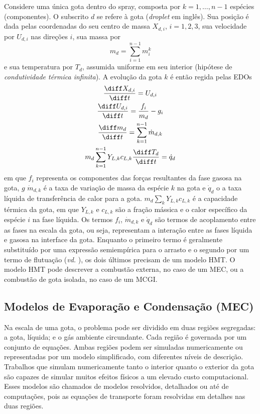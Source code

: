 Considere uma única gota dentro do spray, composta por $k=1,\ldots,n-1$ espécies (componentes).
O subscrito $d$ se refere à gota (\emph{droplet} em inglês).
Sua posição é dada pelas coordenadas do seu centro de massa $X_{d,i}$, $i=1,2,3$, sua velocidade por $U_{d,i}$ nas direções $i$, sua massa por 
\begin{equation}    
    m_d = \sum_{i=1}^{n-1} m_{i}^k
\end{equation}
e sua temperatura por $T_d$, assumida uniforme em seu interior (hipótese de \emph{condutividade térmica infinita}).
A evolução da gota $k$ é então regida pelas EDOs \cite{JennyB2012}
\begin{gather}
    \frac{\diff X_{d,i}}{\diff t} = U_{d,i}
    \label{eq:Ud}\\
    \frac{\diff U_{d,i}}{\diff t} =
    \frac{f_i}{ m_{d}} -
    g_i 
    \label{eq:Xd} \\
    \frac{\diff m_{d}}{\diff t} = \sum_{k=1}^{n-1} \dot m_{d,k}
    \label{eq:md} \\
    m_d \sum_{k=1}^{n-1} Y_{L,k} c_{L,k} \frac{\diff T_d}{\diff t} = \dot q_d
    \label{eq:Td}
\end{gather}
em que $f_i$ representa os componentes das forças resultantes da fase gasosa na gota, $g$
$\dot m_{d,k}$ é a taxa de variação de massa da espécie $k$ na gota e $\dot q_d$ o a taxa líquida de transferência de calor para a gota.
$ m_d \sum_k Y_{L,k} c_{L,k}$ é a capacidade térmica da gota, em que 
$Y_{L,k}$ e $c_{L,k}$ são a fração mássica e o calor específico da  espécie $i$ na fase líquida.
Os termos $f_i$, $\dot m_{d,k}$ e $\dot q_d$ são termos de acoplamento entre as fases na escala da gota, ou seja, representam a interação entre as fases líquida e gasosa na interface da gota.
Enquanto o primeiro termo é geralmente substituído por uma expressão semiempírica para o arrasto e o segundo por um termo de flutuação (\emph{vd.} \cite[p. 16]{JennyB2012}), os dois últimos precisam de um modelo HMT.
O modelo HMT pode descrever a combustão externa, no caso de um MEC, ou a combustão de gota isolada, no caso de um MCGI.  



\subsection{Modelos de Evaporação e Condensação (MEC)} \label{sec:MEC}

Na escala de uma gota, o problema pode ser dividido em duas regiões segregadas: a gota, líquida; e o gás ambiente circundante. 
Cada região é governada por um conjunto de equações.
Ambas regiões podem ser simuladas numericamente ou representadas por um modelo simplificado, com diferentes níveis de descrição.
Trabalhos que simulam numericamente tanto o interior quanto o exterior da gota são capazes de simular muitos efeitos físicos a um elevado custo computacional.
Esses modelos são chamados de modelos resolvidos, detalhados ou até de computações, pois as equações de transporte foram resolvidas em detalhes nas duas regiões.

